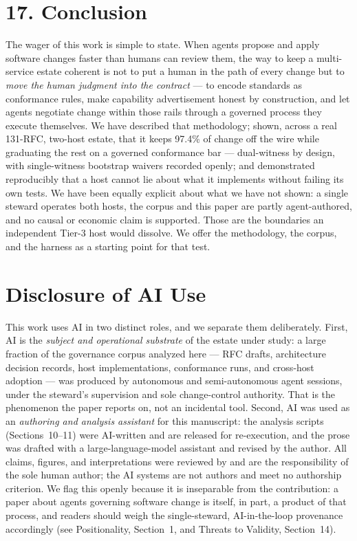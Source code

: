 \documentclass[11pt]{article}
\begin{document}
\section*{17. Conclusion}
The wager of this work is simple to state. When agents propose and apply software changes faster than
humans can review them, the way to keep a multi-service estate coherent is not to put a human in the
path of every change but to \emph{move the human judgment into the contract} --- to encode standards as
conformance rules, make capability advertisement honest by construction, and let agents negotiate
change within those rails through a governed process they execute themselves. We have described that
methodology; shown, across a real 131-RFC, two-host estate, that it keeps 97.4\% of change off the wire
while graduating the rest on a governed conformance bar --- dual-witness by design, with
single-witness bootstrap waivers recorded openly; and demonstrated reproducibly that a host
cannot lie about what it implements without failing its own tests. We have been equally explicit about
what we have not shown: a single steward operates both hosts, the corpus and this paper are partly
agent-authored, and no causal or economic claim is supported. Those are the boundaries an independent
Tier-3 host would dissolve. We offer the methodology, the corpus, and the harness as a starting point
for that test.

\section*{Disclosure of AI Use}
This work uses AI in two distinct roles, and we separate them deliberately. First, AI is the
\emph{subject and operational substrate} of the estate under study: a large fraction of the governance
corpus analyzed here --- RFC drafts, architecture decision records, host implementations, conformance
runs, and cross-host adoption --- was produced by autonomous and semi-autonomous agent sessions, under
the steward's supervision and sole change-control authority. That is the phenomenon the paper reports
on, not an incidental tool. Second, AI was used as an \emph{authoring and analysis assistant} for this
manuscript: the analysis scripts (Sections~10--11) were AI-written and are released for re-execution,
and the prose was drafted with a large-language-model assistant and revised by the author. All claims,
figures, and interpretations were reviewed by and are the responsibility of the sole human author; the
AI systems are not authors and meet no authorship criterion. We flag this openly because it is
inseparable from the contribution: a paper about agents governing software change is itself, in part,
a product of that process, and readers should weigh the single-steward, AI-in-the-loop provenance
accordingly (see Positionality, Section~1, and Threats to Validity, Section~14).
\end{document}

